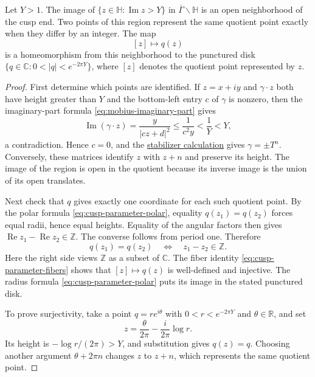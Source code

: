 \begin{proposition}\label{modular.cusp-coordinate}
Let $Y>1$. The image of $\{z\in\mathbb H:\operatorname{Im}z>Y\}$ in $\overline\Gamma\backslash\mathbb H$ is an open neighborhood of the cusp end. Two points of this region represent the same quotient point exactly when they differ by an integer. The map
\[
 [z]\longmapsto q(z)
\]
is a homeomorphism from this neighborhood to the punctured disk $\{q\in\mathbb C:0<|q|<e^{-2\pi Y}\}$, where $[z]$ denotes the quotient point represented by $z$.
\end{proposition}

\begin{proof}
First determine which points are identified. If $z=x+iy$ and $\gamma\cdot z$ both have height greater than $Y$ and the bottom-left entry $c$ of $\gamma$ is nonzero, then the imaginary-part formula \eqref{eq:mobius-imaginary-part} gives
\[
 \operatorname{Im}(\gamma\cdot z)=\frac{y}{|cz+d|^2}
 \leq\frac1{c^2y}<\frac1Y<Y,
\]
a contradiction. Hence $c=0$, and the \hyperref[modular.cusp-stabilizer]{stabilizer calculation} gives $\gamma=\pm T^n$. Conversely, these matrices identify $z$ with $z+n$ and preserve its height. The image of the region is open in the quotient because its inverse image is the union of its open translates.

Next check that $q$ gives exactly one coordinate for each such quotient point. By the polar formula \eqref{eq:cusp-parameter-polar}, equality $q(z_1)=q(z_2)$ forces equal radii, hence equal heights. Equality of the angular factors then gives $\operatorname{Re}z_1-\operatorname{Re}z_2\in\mathbb Z$. The converse follows from period one. Therefore
\begin{equation}\label{eq:cusp-parameter-fibers}
 q(z_1)=q(z_2)\quad\Longleftrightarrow\quad z_1-z_2\in\mathbb Z.
\end{equation}
Here the right side views $\mathbb Z$ as a subset of $\mathbb C$. The fiber identity \eqref{eq:cusp-parameter-fibers} shows that $[z]\mapsto q(z)$ is well-defined and injective. The radius formula \eqref{eq:cusp-parameter-polar} puts its image in the stated punctured disk.

To prove surjectivity, take a point $q=re^{i\theta}$ with $0<r<e^{-2\pi Y}$ and $\theta\in\mathbb R$, and set
\begin{equation}\label{eq:cusp-coordinate-inverse}
 z=\frac{\theta}{2\pi}-\frac{i}{2\pi}\log r.
\end{equation}
Its height is $-\log r/(2\pi)>Y$, and substitution gives $q(z)=q$. Choosing another argument $\theta+2\pi n$ changes $z$ to $z+n$, which represents the same quotient point.


\end{proof}
